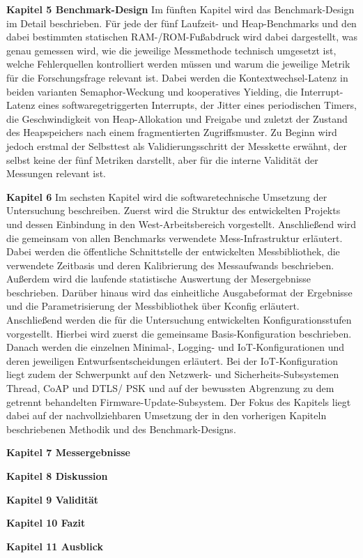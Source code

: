 \textbf{Kapitel 5 Benchmark-Design }Im fünften Kapitel wird das Benchmark-Design im Detail\textbf{ }beschrieben.\textbf{ }Für jede der fünf Laufzeit- und Heap-Benchmarks und den dabei bestimmten statischen RAM-/ROM-Fußabdruck wird dabei dargestellt, was genau gemessen wird, wie die jeweilige Messmethode technisch umgesetzt ist, welche Fehlerquellen kontrolliert werden müssen und warum die jeweilige Metrik für die Forschungsfrage relevant ist. Dabei werden die Kontextwechsel-Latenz in beiden varianten Semaphor-Weckung und kooperatives Yielding, die Interrupt-Latenz eines softwaregetriggerten Interrupts, der Jitter eines periodischen Timers, die Geschwindigkeit von Heap-Allokation und Freigabe und zuletzt der Zustand des Heapspeichers nach einem fragmentierten Zugriffsmuster. Zu Beginn wird jedoch erstmal der Selbsttest als Validierungsschritt der Messkette erwähnt, der selbst keine der fünf Metriken darstellt, aber für die interne Validität der Messungen relevant ist.\textbf{ }

\textbf{Kapitel 6 }Im sechsten Kapitel wird die softwaretechnische Umsetzung der Untersuchung beschreiben. Zuerst wird die Struktur des entwickelten Projekts und dessen Einbindung in den West-Arbeitsbereich vorgestellt. Anschließend wird die gemeinsam von allen Benchmarks verwendete Mess-Infrastruktur erläutert. Dabei werden die öffentliche Schnittstelle der entwickelten Messbibliothek, die verwendete Zeitbasis und deren Kalibrierung des Messaufwands beschrieben. Außerdem wird die laufende statistische Auswertung der Mesergebnisse beschrieben. Darüber hinaus wird das einheitliche Ausgabeformat der Ergebnisse und die Parametrisierung der Messbibliothek über Kconfig erläutert.\textbf{ }Anschließend werden die für die Untersuchung entwickelten Konfigurationsstufen vorgestellt. Hierbei wird zuerst die gemeinsame Basis-Konfiguration beschrieben. Danach werden die einzelnen Minimal-, Logging- und IoT-Konfigurationen und deren jeweiligen Entwurfsentscheidungen erläutert. Bei der IoT-Konfiguration liegt zudem der Schwerpunkt auf den Netzwerk- und Sicherheits-Subsystemen Thread, CoAP und DTLS/ PSK und auf der bewussten Abgrenzung zu dem getrennt behandelten Firmware-Update-Subsystem. Der Fokus des Kapitels liegt dabei auf der nachvollziehbaren Umsetzung der in den vorherigen Kapiteln beschriebenen Methodik und des Benchmark-Designs.

\textbf{Kapitel 7 Messergebnisse}

\textbf{Kapitel 8 Diskussion}

\textbf{Kapitel 9 Validität}

\textbf{Kapitel 10 Fazit}

\textbf{Kapitel 11 Ausblick}
